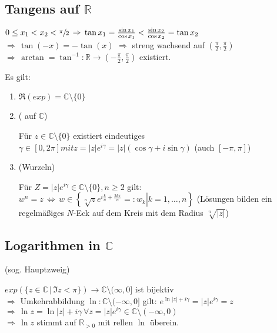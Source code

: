 \subsection*{Tangens auf $\mathbb{R}$}
\begin{*definition}
	$0 \le x_1 < x_2 < \sfrac{\pi}{2} \,\Rightarrow\,\tan x_1 = \frac{\sin x_1}{\cos x_1} < \frac{\sin x_2}{\cos x_2} = \tan x_2$ \\
	$\Rightarrow\,\tan (-x) = - \tan(x) $ $\Rightarrow$ streng wachsend auf $\left( \frac{\pi}{2},\frac{\pi}{2}\right)$ \\
	$\Rightarrow\,\arctan = \tan^{-1}: \mathbb{R}\to \left(-\frac{\pi}{2},\frac{\pi}{2}\right)$ existiert.
\end{*definition}
\begin{proposition}
	Es gilt:
	\begin{enumerate}[label={\arabic*)}]
		\item $\Re(exp) = \mathbb{C}\setminus\{0\}$
		\item ( auf $\mathbb{C}$)
		
		Für $z\in\mathbb{C}\setminus\{0\}$ existiert eindeutiges $\gamma\in[0,2\pi] mit z = |z|e^{i\gamma} = |z|\left( \cos \gamma + i\sin \gamma\right)$ (auch $[-\pi,\pi]$)
		\item (Wurzeln)
		
		Für $Z=|z|e^{i\gamma}\in\mathbb{C}\setminus\{0\}, n\ge 2$ gilt:\\
		$w^n = z \,\Leftrightarrow\, w\in\left\{ \left. \sqrt[n]{z} e^{i \frac{k}{n} + \frac{2k\pi}{n}} =: w_k \right| k=1,\dotsc,n\right\}$ (Lösungen bilden ein regelmäßiges $N$-Eck auf dem Kreis mit dem Radius $\sqrt[n]{|z|}$)
	\end{enumerate}
\end{proposition}

\subsection*{Logarithmen in $\mathbb{C}$} (sog. Hauptzweig)
\begin{*definition}
	$exp\left( \{ z\in\mathbb{C}\,|\, \Im z < \pi \}\right) \to \mathbb{C}\setminus (\infty, 0]$ ist bijektiv \\
	$\Rightarrow$ Umkehrabbildung $\ln:\mathbb{C}\setminus(-\infty,0]$ gilt: $e^{\ln |z| + i\gamma} = |z|e^{i\gamma} = z$\\
	$\Rightarrow\,\ln z = \ln |z| + i\gamma \,\forall z=|z|e^{i\gamma}\in\mathbb{C}\setminus(-\infty,0)$\\
	$\Rightarrow \,\ln z$ stimmt auf $\mathbb{R}_{>0}$ mit rellen $\ln$ überein.
\end{*definition}

